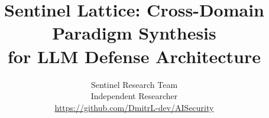 \documentclass[letterpaper,twocolumn,10pt]{article}
\begin{document}
\title{Sentinel Lattice: Cross-Domain Paradigm Synthesis\\for LLM Defense Architecture}

\author{
{\rm Sentinel Research Team}\\
Independent Researcher\\
\url{https://github.com/DmitrL-dev/AISecurity}
}

\maketitle

















\end{document}

